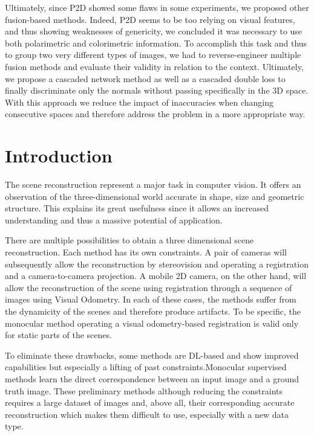 Ultimately, since P2D showed some flaws in some experiments, we proposed other fusion-based methods. 
Indeed, P2D seems to be too relying on visual features, and thus showing weaknesses of genericity, we concluded it was necessary to use both polarimetric and colorimetric information. To accomplish this task and thus to group two very different types of images, we had to reverse-engineer multiple fusion methods and evaluate their validity in relation to the context. Ultimately, we propose a cascaded network method as well as a cascaded double loss to finally discriminate only the normals without passing specifically in the 3D space. With this approach we reduce the impact of inaccuracies when changing consecutive spaces and therefore address the problem in a more appropriate way.

\section{Introduction}
The scene reconstruction represent a major task in computer vision. It offers an observation of the three-dimensional world accurate in shape, size and geometric structure. This explains its great usefulness since it allows an increased understanding and thus a massive potential of application.

There are multiple possibilities to obtain a three dimensional scene reconstruction. Each method has its own constraints. A pair of cameras will subsequently allow the reconstruction by stereovision and operating a registration and a camera-to-camera projection.
A mobile 2D camera, on the other hand, will allow the reconstruction of the scene using registration through a sequence of images using Visual Odometry.
In each of these cases, the methods suffer from the dynamicity of the scenes and therefore produce artifacts. To be specific, the monocular method operating a visual odometry-based registration is valid only for static parts of the scenes.

To eliminate these drawbacks, some methods are DL-based and show improved capabilities but especially a lifting of past constraints.Monocular supervised methods learn the direct correspondence between an input image and a ground truth image. These preliminary methods although reducing the constraints requires a large dataset of images and, above all, their corresponding accurate reconstruction which makes them difficult to use, especially with a new data type. 

